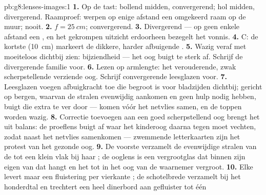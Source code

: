 \begin{solution}{pb:g8:lenses-images:1}
\textbf{1.} Op de tast: bollend midden, convergerend; hol midden,
divergerend. Raamproef:  werpen op enige
afstand een omgekeerd raam op de muur; 
nooit.
\textbf{2.} $f = \qty{25}{cm}$; convergerend.
\textbf{3.} Divergerend --- op geen enkele afstand een
, en het gekrompen uitzicht erdoorheen bezegelt het
vonnis.
\textbf{4.} C: de kortste  (\qty{10}{cm})
markeert de dikkere, harder afbuigende .
\textbf{5.} Wazig veraf met moeiteloos dichtbij zien: bijziendheid ---
het oog buigt te sterk af. Schrijf de divergerende familie voor.
\textbf{6.} Lezen op armlengte: het verouderende, zwak scherpstellende
verziende oog. Schrijf convergerende leesglazen voor.
\textbf{7.} Leesglazen voegen afbuigkracht toe die begroot is voor
bladzijden dichtbij; gericht op bergen, waarvan de stralen evenwijdig
aankomen en geen hulp nodig hebben, buigt die extra  te ver door
---  komen vóór het netvlies samen, en de toppen worden
wazig.
\textbf{8.} Correctie toevoegen aan een goed scherpstellend oog brengt
het uit balans: de proeflens buigt  af
waar het kinderoog daarna tegen moet vechten, zodat
 naast het netvlies samenkomen --- zwemmende
letterkaarten zijn het protest van het gezonde oog.
\textbf{9.} De voorste  verzamelt de evenwijdige stralen
van de  tot een klein  vlak bij haar
; de ooglens is een vergrootglas dat binnen zijn
eigen  van dat  hangt en het
tot in het oog van de waarnemer vergroot.
\textbf{10.} Elke  levert maar een fluistering
 per vierkante ; de
schotelbrede  verzamelt  bij het
honderdtal en trechtert een heel dinerbord aan gefluister tot één

\end{solution}
